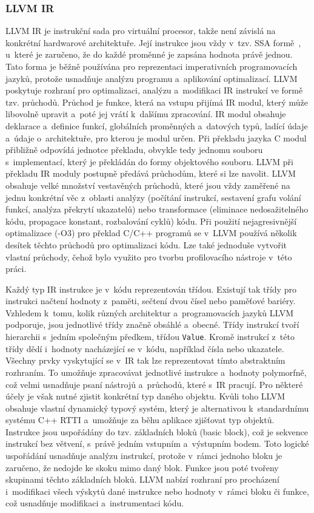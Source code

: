 \subsubsection*{LLVM IR}
LLVM IR je instrukční sada pro virtuální procesor, takže není závislá na konkrétní hardwarové architektuře. Její instrukce jsou vždy v~tzv. SSA formě~\cite{ssa1, ssa2}, u~které je zaručeno, že do každé proměnné je zapsána hodnota právě jednou. Tato forma je běžně používána pro reprezentaci imperativních programovacích jazyků, protože usnadňuje analýzu programu a~aplikování optimalizací. LLVM poskytuje rozhraní pro optimalizaci, analýzu a~modifikaci IR instrukcí ve formě tzv. průchodů.
Průchod je funkce, která na vstupu přijímá IR modul, který může libovolně upravit a~poté jej vrátí k~dalšímu zpracování. IR modul obsahuje deklarace a~definice funkcí, globálních proměnných a~datových typů, ladící údaje a~údaje o~architektuře, pro kterou je modul určen. Při překladu jazyka C modul přibližně odpovídá jednotce překladu, obvykle tedy jednomu souboru s~implementací, který je překládán do formy objektového souboru. LLVM při překladu IR moduly postupně předává průchodům, které si lze navolit. LLVM obsahuje velké množství vestavěných průchodů, které jsou vždy zaměřené na jednu konkrétní věc z~oblasti analýzy (počítání instrukcí, sestavení grafu volání funkcí, analýza překrytí ukazatelů) nebo transformace (eliminace nedosažitelného kódu, propagace konstant, rozbalování cyklů) kódu. Při použití nejagresivnější optimalizace (-O3) pro překlad C/C++ programů se v~LLVM používá několik desítek těchto průchodů pro optimalizaci kódu. Lze také jednoduše vytvořit vlastní průchody, čehož bylo využito pro tvorbu profilovacího nástroje v~této práci.

Každý typ IR instrukce je v~kódu reprezentován třídou. Existují tak třídy pro instrukci načtení hodnoty z~paměti, sečtení dvou čísel nebo paměťové bariéry. Vzhledem k~tomu, kolik různých architektur a~programovacích jazyků LLVM podporuje, jsou jednotlivé třídy značně obsáhlé a~obecné. Třídy instrukcí tvoří hierarchii s~jedním společným předkem, třídou \texttt{Value}. Kromě instrukcí z~této třídy dědí i~hodnoty nacházející se v~kódu, například čísla nebo ukazatele. Všechny prvky vyskytující se v~IR tak lze reprezentovat tímto abstraktním rozhraním. To umožňuje zpracovávat jednotlivé instrukce a~hodnoty polymorfně, což velmi usnadňuje psaní nástrojů a~průchodů, které s~IR pracují. Pro některé účely je však nutné zjistit konkrétní typ daného objektu. Kvůli toho LLVM obsahuje vlastní dynamický typový systém, který je alternativou k~standardnímu systému C++ RTTI a~umožňuje za běhu aplikace zjišťovat typ objektů.
Instrukce jsou uspořádány do tzv. základních bloků (basic block), což je sekvence instrukcí bez větvení, s~právě jedním vstupním a~výstupním bodem. Toto logické uspořádání usnadňuje analýzu instrukcí, protože v~rámci jednoho bloku je zaručeno, že nedojde ke skoku mimo daný blok. Funkce jsou poté tvořeny skupinami těchto základních bloků. LLVM nabízí rozhraní pro procházení i~modifikaci všech výskytů dané instrukce nebo hodnoty v~rámci bloku či funkce, což usnadňuje modifikaci a~instrumentaci kódu.

